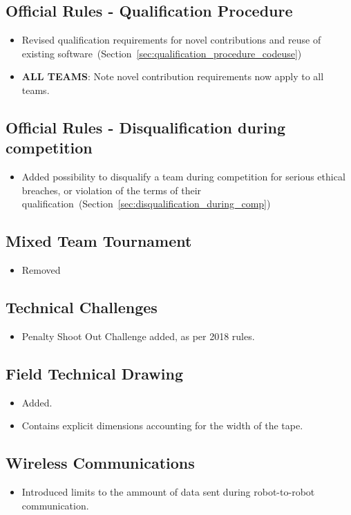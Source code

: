 \subsection*{Official Rules - Qualification Procedure}
\begin{itemize}
  \item Revised qualification requirements for novel contributions and reuse of existing software~(\cf Section~\ref{sec:qualification_procedure_codeuse})
  \item \textbf{ALL TEAMS}: Note novel contribution requirements now apply to all teams.
\end{itemize}


\subsection*{Official Rules - Disqualification during competition}
\begin{itemize}
  \item Added possibility to disqualify a team during competition for serious ethical breaches, or violation of the terms of their qualification~(\cf Section~\ref{sec:disqualification_during_comp})
\end{itemize}

\subsection*{Mixed Team Tournament}
\begin{itemize}
  \item Removed
\end{itemize}

\subsection*{Technical Challenges}
\begin{itemize}
  \item Penalty Shoot Out Challenge added, as per 2018 rules.
\end{itemize}

\subsection*{Field Technical Drawing}
\begin{itemize}
  \item Added.
  \item Contains explicit dimensions accounting for the width of the tape.
\end{itemize}

\subsection*{Wireless Communications}
\begin{itemize}
  \item Introduced limits to the ammount of data sent during robot-to-robot communication.
\end{itemize}
